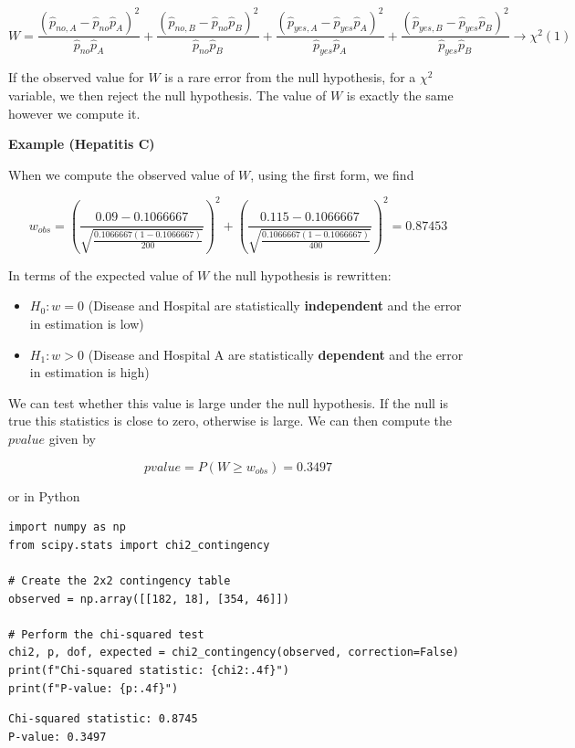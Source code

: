 \documentclass[
]{book}
\providecommand{\tightlist}{%
  \setlength{\itemsep}{0pt}\setlength{\parskip}{0pt}}
\begin{document}
\[W= \frac{(\hat{p}_{no,A}-\hat{p}_{no}\hat{p}_{A})^2}{\hat{p}_{no}\hat{p}_{A}}+\frac{(\hat{p}_{no,B}-\hat{p}_{no}\hat{p}_{B})^2}{\hat{p}_{no}\hat{p}_{B}}+\frac{(\hat{p}_{yes,A}-\hat{p}_{yes}\hat{p}_{A})^2}{\hat{p}_{yes}\hat{p}_{A}}+\frac{(\hat{p}_{yes,B}-\hat{p}_{yes}\hat{p}_{B})^2}{\hat{p}_{yes}\hat{p}_{B}}\rightarrow \chi^2(1)\]

If the observed value for \(W\) is a rare error from the null hypothesis, for a \(\chi^2\) variable, we then reject the null hypothesis. The value of \(W\) is exactly the same however we compute it.

\textbf{Example (Hepatitis C)}

When we compute the observed value of \(W\), using the first form, we find

\[w_{obs}= (\frac{0.09-0.1066667}{\sqrt{\frac{0.1066667(1-0.1066667)}{200}}})^2+( \frac{0.115-0.1066667}{\sqrt{\frac{0.1066667(1-0.1066667)}{400}}})^2= 0.87453\]

In terms of the expected value of \(W\) the null hypothesis is rewritten:

\begin{itemize}
\tightlist
\item
  \(H_0:w=0\) (Disease and Hospital are statistically \textbf{independent} and the error in estimation is low)
\item
  \(H_1:w>0\)
  (Disease and Hospital A are statistically \textbf{dependent} and the error in estimation is high)
\end{itemize}

We can test whether this value is large under the null hypothesis. If the null is true this statistics is close to zero, otherwise is large. We can then compute the \(pvalue\) given by

\[pvalue=P(W \geq w_{obs}) =0.3497\]

or in Python

\begin{verbatim}
import numpy as np
from scipy.stats import chi2_contingency

# Create the 2x2 contingency table
observed = np.array([[182, 18], [354, 46]])

# Perform the chi-squared test
chi2, p, dof, expected = chi2_contingency(observed, correction=False)
print(f"Chi-squared statistic: {chi2:.4f}")
print(f"P-value: {p:.4f}")
\end{verbatim}

\begin{verbatim}
Chi-squared statistic: 0.8745
P-value: 0.3497
\end{verbatim}
\end{document}
